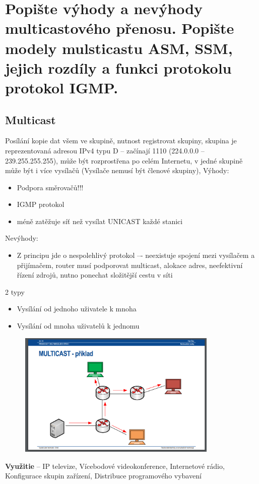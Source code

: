\newpage
\section{Popište výhody a nevýhody multicastového přenosu. Popište modely mulsticastu ASM, SSM, jejich rozdíly a funkci protokolu protokol IGMP.}

\subsection{Multicast}
Posílání kopie dat všem ve skupině, nutnost registrovat skupiny, skupina je reprezentovaná adresou IPv4 typu D – začínají 1110 (224.0.0.0 – 239.255.255.255), může být rozprostřena po celém Internetu, v jedné skupině může být i více vysílačů (Vysílače nemusí být členové skupiny), 
Výhody: 
\begin{itemize}
    \item Podpora směrovačů!!!
    \item IGMP protokol
    \item méně zatěžuje síť než vysílat UNICAST každé stanici
\end{itemize}

Nevýhody: 
\begin{itemize}
    \item Z principu jde o nespolehlivý protokol –- neexistuje spojení mezi vysílačem a přijímačem, router musí podporovat multicast, alokace adres, neefektivní řízení zdrojů, nutno ponechat složitější cestu v síti
\end{itemize}

2 typy 
\begin{itemize}
    \item Vysílání od jednoho uživatele k mnoha
    \item Vysílání od mnoha uživatelů k jednomu
\end{itemize}

\begin{figure} [h]
     \centering
     \includegraphics[width=0.85\textwidth]{images/multicast.PNG}
\end{figure}
\textbf{Využitie} -- IP televize, Vícebodové videokonference, Internetové rádio, Konfigurace skupin zařízení, Distribuce programového vybavení

